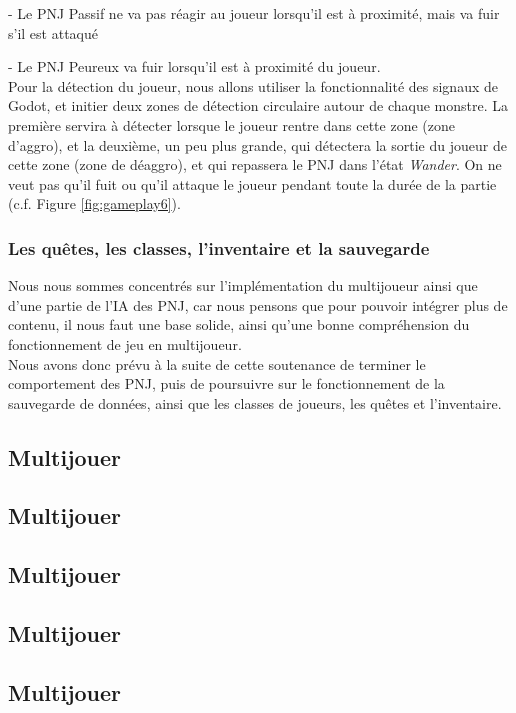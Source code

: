 - Le PNJ Passif ne va pas réagir au joueur lorsqu'il est à proximité, mais va fuir s'il est attaqué

- Le PNJ Peureux va fuir lorsqu'il est à proximité du joueur.
\\

Pour la détection du joueur, nous allons utiliser la fonctionnalité des signaux de Godot, et initier deux zones de détection circulaire autour de chaque monstre.
La première servira à détecter lorsque le joueur rentre dans cette zone (zone d'aggro), et la deuxième, un peu plus grande, qui détectera la sortie du joueur de cette zone (zone de déaggro), et qui repassera le PNJ dans l'état \textit{Wander}.
On ne veut pas qu'il fuit ou qu'il attaque le joueur pendant toute la durée de la partie (c.f. Figure \ref*{fig:gameplay6}).



\subsubsection*{Les quêtes, les classes, l'inventaire et la sauvegarde}

Nous nous sommes concentrés sur l'implémentation du multijoueur ainsi que d'une partie de l'IA des PNJ, car nous pensons que pour pouvoir intégrer plus de contenu, il nous faut une base solide, ainsi qu'une bonne compréhension du fonctionnement de jeu en multijoueur.
\\

Nous avons donc prévu à la suite de cette soutenance de terminer le comportement des PNJ, puis de poursuivre sur le fonctionnement de la sauvegarde de données, ainsi que les classes de joueurs, les quêtes et l'inventaire.

\subsection{Multijouer}
\subsection{Multijouer}
\subsection{Multijouer}
\subsection{Multijouer}
\subsection{Multijouer}
